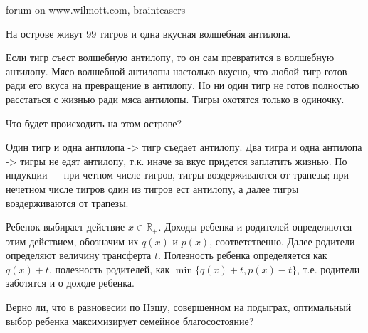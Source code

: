 \begin{problem}
\begin{source}
forum on www.wilmott.com, brainteasers
\end{source}
На острове живут 99 тигров и одна вкусная волшебная антилопа. \par
Если тигр съест волшебную антилопу, то он сам превратится в волшебную антилопу. Мясо волшебной антилопы настолько вкусно, что любой тигр готов ради его вкуса на превращение в антилопу. Но ни один тигр не готов полностью расстаться с жизнью ради мяса антилопы. Тигры охотятся только в одиночку.\par
Что будет происходить на этом острове? \par

\begin{sol}
 Один тигр и одна антилопа -> тигр съедает антилопу. Два тигра и одна антилопа -> тигры не едят антилопу, т.к. иначе за вкус придется заплатить жизнью. По индукции — при четном числе тигров, тигры воздерживаются от трапезы; при нечетном числе тигров один из тигров ест антилопу, а далее тигры воздерживаются от трапезы.
\end{sol}
\end{problem}





\begin{problem}
 Ребенок выбирает действие $x\in \mathbb{R}_{+}$. Доходы ребенка и
родителей определяются этим действием, обозначим их $q(x)$ и
$p(x)$, соответственно. Далее родители определяют величину
трансферта $t$. Полезность ребенка определяется как $q(x)+t$,
полезность родителей, как $\min\{q(x)+t,p(x)-t\}$, т.е. родители
заботятся и о доходе ребенка. \par
Верно ли, что в равновесии по Нэшу, совершенном на подыграх,
оптимальный выбор ребенка максимизирует семейное благосостояние?



\begin{sol}

\end{sol}
\end{problem}





